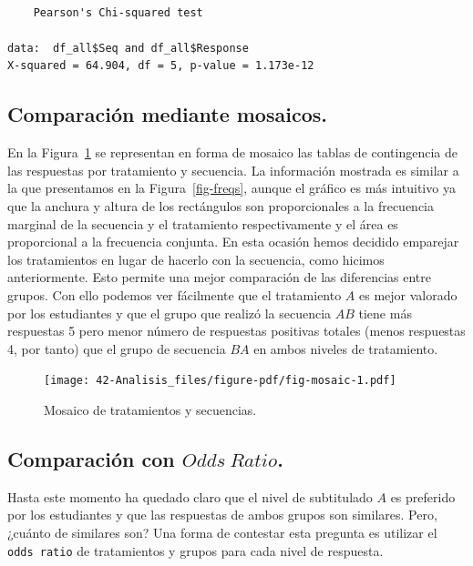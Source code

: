 \documentclass[
  12pt,
  a4paper,
  extrafontsizes,
  onecolumn,
  openright]{memoir}
\begin{document}
\begin{verbatim}

    Pearson's Chi-squared test

data:  df_all$Seq and df_all$Response
X-squared = 64.904, df = 5, p-value = 1.173e-12
\end{verbatim}

\normalsize

\hypertarget{comparaciuxf3n-mediante-mosaicos.}{%
\subsection{Comparación mediante
mosaicos.}\label{comparaciuxf3n-mediante-mosaicos.}}

En la Figura~\ref{fig-mosaic} se representan en forma de mosaico las
tablas de contingencia de las respuestas por tratamiento y secuencia. La
información mostrada es similar a la que presentamos en la
Figura~\ref{fig-freqs}, aunque el gráfico es más intuitivo ya que la
anchura y altura de los rectángulos son proporcionales a la frecuencia
marginal de la secuencia y el tratamiento respectivamente y el área es
proporcional a la frecuencia conjunta. En esta ocasión hemos decidido
emparejar los tratamientos en lugar de hacerlo con la secuencia, como
hicimos anteriormente. Esto permite una mejor comparación de las
diferencias entre grupos. Con ello podemos ver fácilmente que el
tratamiento \(A\) es mejor valorado por los estudiantes y que el grupo
que realizó la secuencia \(AB\) tiene más respuestas 5 pero menor número
de respuestas positivas totales (menos respuestas 4, por tanto) que el
grupo de secuencia \(BA\) en ambos niveles de tratamiento.

\begin{figure}[h]

{\centering \texttt{[image: 42-Analisis\_files/figure-pdf/fig-mosaic-1.pdf]}

}

\caption{\label{fig-mosaic}Mosaico de tratamientos y secuencias.}

\end{figure}

\hypertarget{sec-or}{%
\subsection{\texorpdfstring{Comparación con
\(Odds\ Ratio\).}{Comparación con Odds\textbackslash{} Ratio.}}\label{sec-or}}

Hasta este momento ha quedado claro que el nivel de subtitulado \(A\) es
preferido por los estudiantes y que las respuestas de ambos grupos son
similares. Pero, ¿cuánto de similares son? Una forma de contestar esta
pregunta es utilizar el \texttt{odds\ ratio} de tratamientos y grupos
para cada nivel de respuesta.
\end{document}
